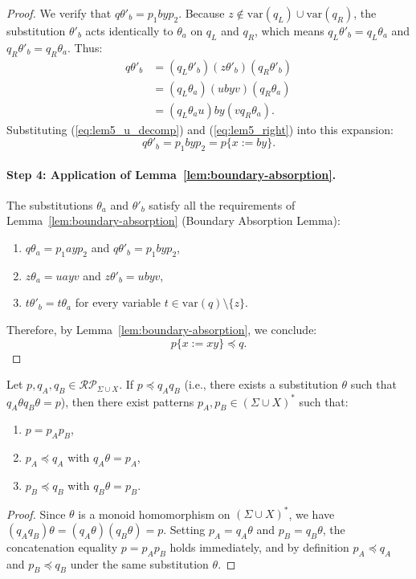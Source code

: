 {\begin{proof}
We verify that $q\theta'_b = p_1 b y p_2$. Because $z \notin \mathrm{var}(q_L) \cup \mathrm{var}(q_R)$, the substitution $\theta'_b$ acts identically to $\theta_a$ on $q_L$ and $q_R$, which means $q_L\theta'_b = q_L\theta_a$ and $q_R\theta'_b = q_R\theta_a$. Thus:
\begin{align*}
q\theta'_b &= (q_L\theta'_b)(z\theta'_b)(q_R\theta'_b) \\
           &= (q_L\theta_a)(u b y v)(q_R\theta_a) \\
           &= (q_L\theta_a u) b y (v q_R\theta_a).
\end{align*}
Substituting (\ref{eq:lem5_u_decomp}) and (\ref{eq:lem5_right}) into this expansion:
\[
q\theta'_b = p_1 b y p_2 = p\{x := by\}.
\]

\paragraph{Step 4: Application of Lemma~\ref{lem:boundary-absorption}.}
The substitutions $\theta_a$ and $\theta'_b$ satisfy all the requirements of Lemma~\ref{lem:boundary-absorption} (Boundary Absorption Lemma):
\begin{enumerate}
    \item $q\theta_a = p_1 a y p_2$ and $q\theta'_b = p_1 b y p_2$,
    \item $z\theta_a = u a y v$ and $z\theta'_b = u b y v$,
    \item $t\theta'_b = t\theta_a$ for every variable $t \in \mathrm{var}(q) \setminus \{z\}$.
\end{enumerate}
Therefore, by Lemma~\ref{lem:boundary-absorption}, we conclude:
\[
p\{x := xy\} \preceq q.
\]\end{proof}

\begin{prop}\label{prop:factorization}
Let $p, q_A, q_B \in \mathcal{RP}_{\Sigma \cup X}$. If $p \preceq q_A q_B$ (i.e., there exists a substitution $\theta$ such that $q_A\theta q_B\theta = p$), then there exist patterns $p_A, p_B \in (\Sigma \cup X)^*$ such that:
\begin{enumerate}
    \item $p = p_A p_B$,
    \item $p_A \preceq q_A$ with $q_A\theta = p_A$,
    \item $p_B \preceq q_B$ with $q_B\theta = p_B$.
\end{enumerate}
\end{prop}
\begin{proof}
Since $\theta$ is a monoid homomorphism on $(\Sigma \cup X)^*$, we have $(q_A q_B)\theta = (q_A\theta)(q_B\theta) = p$. Setting $p_A = q_A\theta$ and $p_B = q_B\theta$, the concatenation equality $p = p_A p_B$ holds immediately, and by definition $p_A \preceq q_A$ and $p_B \preceq q_B$ under the same substitution $\theta$.
\end{proof}

}
